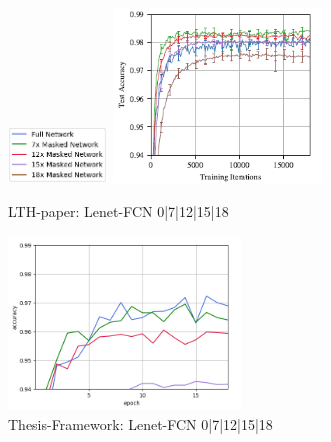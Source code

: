 \begin{figure}
	\begin{minipage}{\textwidth}
		\centering
		\includegraphics[width=100px]{gfx/7-Evaluation/LTH_2_legend.png}
	\end{minipage}
	\begin{minipage}{0.5\textwidth}
		\centering
		\includegraphics[height=175px]{gfx/7-Evaluation/LTH_2.png}
		\caption*{LTH-paper: Lenet-FCN 0|7|12|15|18}
		\label{?}
	\end{minipage}\hfill
	\begin{minipage}{0.5\textwidth}
		\centering
		\includegraphics[height=175px]{gfx/Experiments/Reproduction-MNIST-FCN/accuracy/LTH_2.png}
		\caption*{Thesis-Framework: Lenet-FCN 0|7|12|15|18}
		\label{?}
	\end{minipage}
\end{figure}

